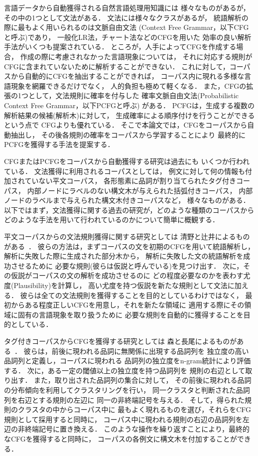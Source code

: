 言語データから自動獲得される自然言語処理用知識には
様々なものがあるが，その中の1つとして文法がある．
文法には様々なクラスがあるが，
統語解析の際に最もよく用いられるのは文脈自由文法
(Context Free Grammar，以下CFGと呼ぶ)であり，
一般化LR法，チャート法などのCFGを用いた
効率の良い解析手法がいくつも提案されている．
ところが，人手によってCFGを作成する場合，
作成の際に考慮されなかった言語現象については，
それに対応する規則がCFGに含まれていないために解析することができない．
これに対して，コーパスから自動的にCFGを抽出することができれば，
コーパス内に現れる多様な言語現象を網羅できるだけでなく，
人的負担も極めて軽くなる．
また，CFGの拡張の1つとして，文法規則に確率を付与した
確率文脈自由文法(Probabilistic Context Free Grammar，以下PCFGと呼ぶ)
がある．
PCFGは，生成する複数の解析結果の候補(解析木)に対して，
生成確率による順序付けを行うことができるという点で
CFGよりも優れている．
そこで本論文では，CFGをコーパスから自動抽出し，
その後各規則の確率をコーパスから学習することにより
最終的にPCFGを獲得する手法を提案する．

CFGまたはPCFGをコーパスから自動獲得する研究は過去にも
いくつか行われている．
文法獲得に利用されるコーパスとしては，
例文に対して何の情報も付加されていない平文コーパス，
各形態素に品詞が割り当てられたタグ付きコーパス，
内部ノードにラベルのない構文木が与えられた括弧付きコーパス，
内部ノードのラベルまで与えられた構文木付きコーパスなど，
様々なものがある．
以下ではまず，文法獲得に関する過去の研究が，どのような種類のコーパスから
どのような手法を用いて行われているのかについて簡単に概観する．

平文コーパスからの文法規則獲得に関する研究としては
清野と辻井によるものがある~．
彼らの方法は，まずコーパスの文を初期のCFGを用いて統語解析し，
解析に失敗した際に生成された部分木から，
解析に失敗した文の統語解析を成功させるために
必要な規則(彼らは仮説と呼んでいる)を見つけ出す．
次に，その仮説がコーパスの文の解析を成功させるのに
どの程度必要なのかを表わす尤度(Plausibility)を計算し，
高い尤度を持つ仮説を新たな規則として文法に加える．
彼らは全ての文法規則を獲得することを目的としているわけではなく，
最初からある程度正しいCFGを用意し，それを新たな領域に
適用する際にその領域に固有の言語現象を取り扱うために
必要な規則を自動的に獲得することを目的としている．

タグ付きコーパスからCFGを獲得する研究としては
森と長尾によるものがある~．
彼らは，前後に現われる品詞に無関係に出現する品詞列を
独立度の高い品詞列と定義し，コーパスに現われる
品詞列の独立度をn-gram統計により評価する．
次に，ある一定の閾値以上の独立度を持つ品詞列を
規則の右辺として取り出す．
また，取り出された品詞列の集合に対して，
その前後に現われる品詞の分布傾向を利用してクラスタリングを行い，
同一クラスタと判断された品詞列を右辺とする規則の左辺に
同一の非終端記号を与える．
そして，得られた規則のクラスタの中からコーパス中に
最もよく現れるものを選び，それらをCFG規則として採用すると同時に，
コーパス中に現われる規則の右辺の品詞列を左辺の非終端記号に置き換える．
このような操作を繰り返すことにより，最終的なCFGを獲得すると同時に，
コーパスの各例文に構文木を付加することができる．



